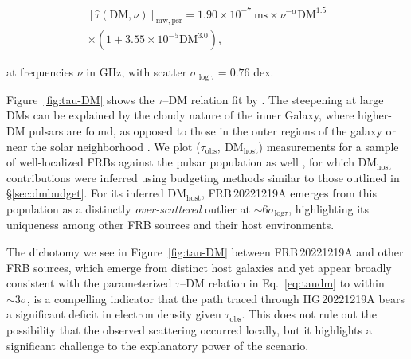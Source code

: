 \documentclass[twocolumn, linenumbers, tra]{aastex631}
\newcommand{\rev}[1]{{\color{purple}#1}}
\newcommand{\nihari}{FRB\,20221219A } %
\begin{document}
\begin{equation}\label{eq:taudm}
\begin{aligned}
\left[\widehat{\tau}\left(\mathrm{DM}, \nu\right)\right]_{\mathrm{mw}, \mathrm{psr}} = 1.90 \times 10^{-7} \mathrm{\ ms} \times \nu^{-\alpha} \mathrm{DM}^{1.5} \\
\times\left(1+3.55 \times 10^{-5} \mathrm{DM}^{3.0}\right),
\end{aligned}
\end{equation}

\noindent
at frequencies $\nu$ in GHz, with scatter $\sigma_{\log \tau}=0.76$ dex. 

Figure\ \ref{fig:tau-DM} shows the $\tau$--$\mathrm{DM}$ relation fit by \citet{Cordes2016}. The steepening at large DMs can be explained by the cloudy nature of the inner Galaxy, where higher-DM pulsars are found, as opposed to those in the outer regions of the galaxy or near the solar neighborhood \citep{Cordes1991, Cordes2019}. We plot ($\tau_{\mathrm{obs}},\ \mathrm{DM}_{\mathrm{host}}$) measurements for a sample of well-localized FRBs against the pulsar population as well \citep{Tendulkar2017, Marcote2017, Marcote2020, Prochaska2019b, Bannister2019, Bhandari2020, Macquart2020, Day2020, Day2021, Ocker2022b}, for which DM$_{\mathrm{host}}$ contributions were inferred using budgeting methods similar to those outlined in \S\protect\ref{sec:dmbudget}. For its inferred DM$_{\mathrm{host}}$, \nihari emerges from this population as a distinctly \textit{over-scattered} outlier at $ \sim 6\sigma_{\mathrm{log}\tau}$, highlighting its uniqueness among other FRB sources and their host environments.

\rev{The dichotomy we see in Figure\ \ref{fig:tau-DM} between \nihari and other FRB sources, which emerge from distinct host galaxies and yet appear broadly consistent with the parameterized $\tau$--DM relation in Eq.~\ref{eq:taudm} to within $ \sim 3\sigma$, is a compelling indicator that the path traced through HG\,20221219A bears a significant deficit in electron density given $\tau_{\mathrm{obs}}$. This does not rule out the possibility that the observed scattering occurred locally, but it highlights a significant challenge to the explanatory power of the scenario.} 
\end{document}
